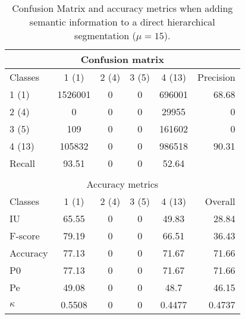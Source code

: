 \begin{table}[H]
\begin{center}
\begin{tabular}{|l|c|c|c|c|r|}
\hline
\multicolumn{6}{|c|}{Confusion matrix} \\
\hline
 Classes & 1 (1) & 2 (4) & 3 (5) & 4 (13) & Precision \\
\hline
1 (1) & 1526001 & 0 & 0 & 696001 & 68.68 \\
\hline
2 (4) & 0 & 0 & 0 & 29955 & 0 \\
\hline
3 (5) & 109 & 0 & 0 & 161602 & 0 \\
\hline
4 (13) & 105832 & 0 & 0 & 986518 & 90.31 \\
\hline
Recall & 93.51 & 0 & 0 & 52.64 &  \\
\hline
\multicolumn{6}{c}{ } \\
\hline
\multicolumn{6}{|c|}{Accuracy metrics} \\
\hline
 Classes & 1 (1) & 2 (4) & 3 (5) & 4 (13) & Overall \\
\hline
IU & 65.55 & 0 & 0 & 49.83 & 28.84 \\
\hline
F-score & 79.19 & 0 & 0 & 66.51 & 36.43 \\
\hline
Accuracy & 77.13 & 0 & 0 & 71.67 & 71.66 \\
\hline
P0 & 77.13 & 0 & 0 & 71.67 & 71.66 \\
\hline
Pe & 49.08 & 0 & 0 & 48.7 & 46.15 \\
\hline
$\kappa$ & 0.5508 & 0 & 0 & 0.4477 & 0.4737 \\
\hline
\end{tabular}
\caption{Confusion Matrix and accuracy metrics when adding semantic information to a direct hierarchical segmentation ($\mu=15$).}
\label{table:C3_S2_seg_hierar_z}
\end{center}
\end{table}